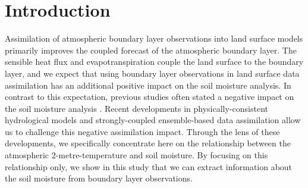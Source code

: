 \documentclass[hess, manuscript]{copernicus}
\begin{document}
%
\section{Introduction}
Assimilation of atmospheric boundary layer observations into land surface models primarily improves the coupled forecast of the atmospheric boundary layer.
The sensible heat flux and evapotranspiration couple the land surface to the boundary layer, and we expect that using boundary layer observations in land surface data assimilation has an additional positive impact on the soil moisture analysis.
In contrast to this expectation, previous studies often stated a negative impact on the soil moisture analysis \citep{hess_assimilation_2001, drusch_assimilation_2007, munozsabater_assimilation_2019, draper_root_2011, su_evaluation_2013, carrera_assimilation_2019}.
Recent developments in physically-consistent hydrological models \citep{fatichi_overview_2016,prein_review_2015,vereecken_modeling_2016} and strongly-coupled ensemble-based data assimilation \citep{sluka_assimilating_2016,penny_coupled_2017} allow us to challenge this negative assimilation impact.
Through the lens of these developments, we specifically concentrate here on the relationship between the atmospheric 2-metre-temperature and soil moisture.
By focusing on this relationship only, we show in this study that we can extract information about the soil moisture from boundary layer observations.
\end{document}
